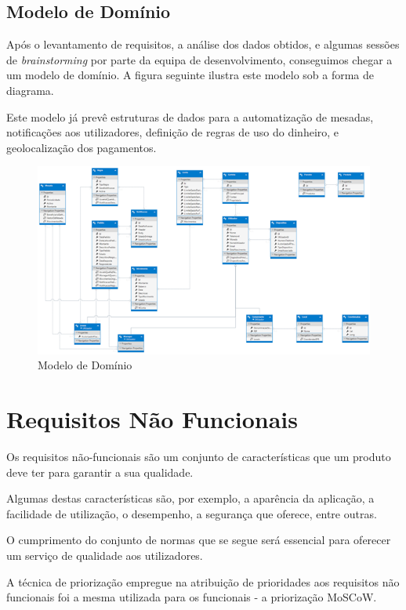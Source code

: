 \documentclass{article}
\begin{document}
  \subsection{Modelo de Domínio}

    Após o levantamento de requisitos, a análise dos dados obtidos, e algumas sessões de \emph{brainstorming} por parte da equipa de desenvolvimento, conseguimos chegar a um modelo de domínio. A figura seguinte ilustra este modelo sob a forma de diagrama.

    Este modelo já prevê estruturas de dados para a automatização de mesadas, notificações aos utilizadores, definição de regras de uso do dinheiro, e geolocalização dos pagamentos.


      \begin{figure}[ht!]
        \centering
          \includegraphics[width=\linewidth]{img/img14}
          \caption{Modelo de Domínio}
          \label{img14}
      \end{figure}

\newpage

\section{Requisitos Não Funcionais}

  Os requisitos não-funcionais são um conjunto de características que um produto deve ter para garantir a sua qualidade.

  Algumas destas características são, por exemplo, a aparência da aplicação, a facilidade de utilização, o desempenho, a segurança que oferece, entre outras.

  O cumprimento do conjunto de normas que se segue será essencial para oferecer um serviço de qualidade aos utilizadores.
  
  A técnica de priorização empregue na atribuição de prioridades aos requisitos não funcionais foi a mesma utilizada para os funcionais - a priorização MoSCoW.
\end{document}
